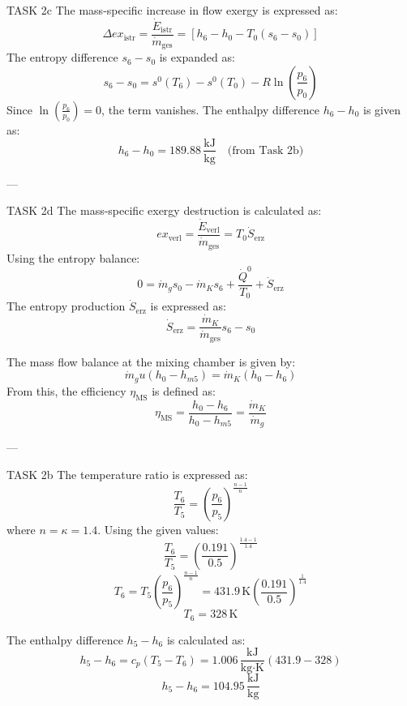 TASK 2c  
The mass-specific increase in flow exergy is expressed as:  
\[
\Delta ex_{\text{istr}} = \frac{\dot{E}_{\text{istr}}}{\dot{m}_{\text{ges}}} = \left[ h_6 - h_0 - T_0 \left( s_6 - s_0 \right) \right]
\]  
The entropy difference \( s_6 - s_0 \) is expanded as:  
\[
s_6 - s_0 = s^0(T_6) - s^0(T_0) - R \ln \left( \frac{p_6}{p_0} \right)
\]  
Since \( \ln \left( \frac{p_6}{p_0} \right) = 0 \), the term vanishes.  
The enthalpy difference \( h_6 - h_0 \) is given as:  
\[
h_6 - h_0 = 189.88 \, \frac{\text{kJ}}{\text{kg}} \quad \text{(from Task 2b)}
\]  

---

TASK 2d  
The mass-specific exergy destruction is calculated as:  
\[
ex_{\text{verl}} = \frac{\dot{E}_{\text{verl}}}{\dot{m}_{\text{ges}}} = T_0 \dot{S}_{\text{erz}}
\]  
Using the entropy balance:  
\[
0 = \dot{m}_g s_0 - \dot{m}_K s_6 + \frac{\dot{Q}^0}{T_0} + \dot{S}_{\text{erz}}
\]  
The entropy production \( \dot{S}_{\text{erz}} \) is expressed as:  
\[
\dot{S}_{\text{erz}} = \frac{\dot{m}_K}{\dot{m}_{\text{ges}}} s_6 - s_0
\]  

The mass flow balance at the mixing chamber is given by:  
\[
\dot{m}_g u(h_0 - h_{m5}) = \dot{m}_K (h_0 - h_6)
\]  
From this, the efficiency \( \eta_{\text{MS}} \) is defined as:  
\[
\eta_{\text{MS}} = \frac{h_0 - h_6}{h_0 - h_{m5}} = \frac{\dot{m}_K}{\dot{m}_g}
\]  

---

TASK 2b  
The temperature ratio is expressed as:  
\[
\frac{T_6}{T_5} = \left( \frac{p_6}{p_5} \right)^{\frac{n-1}{n}}
\]  
where \( n = \kappa = 1.4 \).  
Using the given values:  
\[
\frac{T_6}{T_5} = \left( \frac{0.191}{0.5} \right)^{\frac{1.4 - 1}{1.4}}
\]  
\[
T_6 = T_5 \left( \frac{p_6}{p_5} \right)^{\frac{n-1}{n}} = 431.9 \, \text{K} \left( \frac{0.191}{0.5} \right)^{\frac{1}{1.4}}
\]  
\[
T_6 = 328 \, \text{K}
\]  

The enthalpy difference \( h_5 - h_6 \) is calculated as:  
\[
h_5 - h_6 = c_p \left( T_5 - T_6 \right) = 1.006 \, \frac{\text{kJ}}{\text{kg·K}} \left( 431.9 - 328 \right)
\]  
\[
h_5 - h_6 = 104.95 \, \frac{\text{kJ}}{\text{kg}}
\]